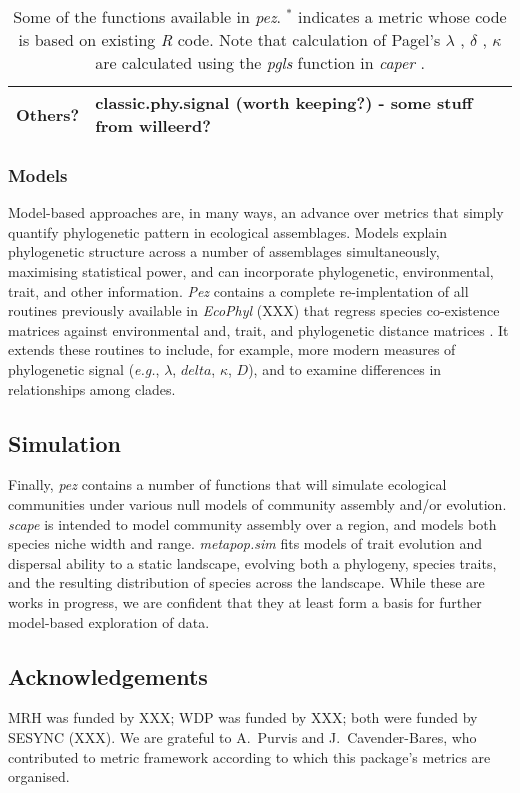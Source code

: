 \documentclass[11pt]{article} %
\begin{document}
\begin{table}
\begin{center}
\begin{tabular}{p{3.5cm} p{14cm}}
  Others? & classic.phy.signal (worth keeping?) - some stuff from willeerd?\\
  \hline
\end{tabular}
\caption{Some of the functions available in \emph{pez}. $^*$ indicates %
  a metric whose code is based on existing \emph{R} code. Note that
  calculation of Pagel's $\lambda$ \autocite{Pagel1999}, $\delta$
  \autocite{Pagel1999}, $\kappa$ \autocite{Pagel1999} are calculated
  using the \emph{pgls} function in \emph{caper} \autocite{Orme2013}.}
\label{metricTable}
\end{center}
\end{table}
\subsubsection*{Models}
Model-based approaches are, in many ways, an advance over metrics that
simply quantify phylogenetic pattern in ecological assemblages. Models
explain phylogenetic structure across a number of assemblages
simultaneously, maximising statistical power, and can incorporate
phylogenetic, environmental, trait, and other information. \emph{Pez}
contains a complete re-implentation of all routines previously
available in \emph{EcoPhyl} (XXX) that regress species co-existence
matrices against environmental and, trait, and phylogenetic distance
matrices \autocite{Cavender-Bares2004,Cavender-Bares2006}. It extends
these routines to include, for example, more modern measures of
phylogenetic signal (\emph{e.g.}, $\lambda$, $delta$, $\kappa$, $D$),
and to examine differences in relationships among clades.
\subsection*{Simulation}
Finally, \emph{pez} contains a number of functions that will simulate
ecological communities under various null models of community assembly
and/or evolution. \emph{scape} is intended to model community assembly
over a region, and models both species niche width and
range. \emph{metapop.sim} fits models of trait evolution and dispersal
ability to a static landscape, evolving both a phylogeny, species
traits, and the resulting distribution of species across the
landscape. While these are works in progress, we are confident that
they at least form a basis for further model-based exploration of
data.
\subsection*{Acknowledgements}
MRH was funded by XXX; WDP was funded by XXX; both were funded by
SESYNC (XXX). We are grateful to A.\ Purvis and J.\ Cavender-Bares,
who contributed to metric framework according to which this package's
metrics are organised.

\printbibliography
\end{document}
